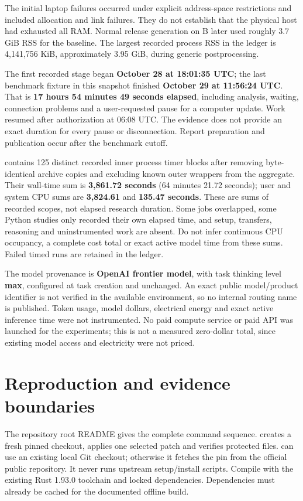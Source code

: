 \documentclass[11pt,letterpaper]{article}
\begin{document}
The initial laptop failures occurred under explicit address-space restrictions and included allocation and link failures. They do not establish that the physical host had exhausted all RAM. Normal release generation on B later used roughly 3.7 GiB RSS for the baseline. The largest recorded process RSS in the ledger is 4,141,756 KiB, approximately 3.95 GiB, during generic postprocessing.


The first recorded stage began \textbf{October 28 at 18:01:35 UTC}; the last benchmark fixture in this snapshot finished \textbf{October 29 at 11:56:24 UTC}. That is \textbf{17 hours 54 minutes 49 seconds elapsed}, including analysis, waiting, connection problems and a user-requested pause for a computer update. Work resumed after authorization at 06:08 UTC. The evidence does not provide an exact duration for every pause or disconnection. Report preparation and publication occur after the benchmark cutoff.


 contains 125 distinct recorded inner process timer blocks after removing byte-identical archive copies and excluding known outer wrappers from the aggregate. Their wall-time sum is \textbf{3,861.72 seconds} (64 minutes 21.72 seconds); user and system CPU sums are \textbf{3,824.61} and \textbf{135.47 seconds}. These are sums of recorded scopes, not elapsed research duration. Some jobs overlapped, some Python studies only recorded their own elapsed time, and setup, transfers, reasoning and uninstrumented work are absent. Do not infer continuous CPU occupancy, a complete cost total or exact active model time from these sums. Failed timed runs are retained in the ledger.


The model provenance is \textbf{OpenAI frontier model}, with task thinking level \textbf{max}, configured at task creation and unchanged. An exact public model/product identifier is not verified in the available environment, so no internal routing name is published. Token usage, model dollars, electrical energy and exact active inference time were not instrumented. No paid compute service or paid API was launched for the experiments; this is not a measured zero-dollar total, since existing model access and electricity were not priced.


\section{Reproduction and evidence boundaries}

The repository root README gives the complete command sequence.  creates a fresh pinned checkout, applies one selected patch and verifies protected files.  can use an existing local Git checkout; otherwise it fetches the pin from the official public repository. It never runs upstream setup/install scripts. Compile with the existing Rust 1.93.0 toolchain and locked dependencies. Dependencies must already be cached for the documented offline build.
\end{document}
